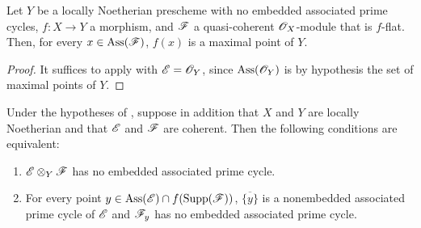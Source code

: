 \begin{corollary}[3.3.2]
\label{IV.3.3.2}
Let $Y$ be a locally Noetherian prescheme with no embedded associated prime cycles, $f:X\to Y$ a morphism, and $\mathscr{F}$ a quasi-coherent $\mathscr{O}_X$-module that is $f$-flat.
Then, for every $x\in\operatorname{Ass}(\mathscr{F})$, $f(x)$ is a maximal point of $Y$.
\end{corollary}

\begin{proof}
It suffices to apply  with $\mathscr{E}=\mathscr{O}_Y$, since $\operatorname{Ass}(\mathscr{O}_Y)$ is by hypothesis the set of maximal points of $Y$.
\end{proof}

\begin{corollary}[3.3.3]
\label{IV.3.3.3}
Under the hypotheses of , suppose in addition that $X$ and $Y$ are locally Noetherian and that $\mathscr{E}$ and $\mathscr{F}$ are coherent.
Then the following conditions are equivalent:
\begin{enumerate}
  \item[\emph{a)}] $\mathscr{E}\otimes_Y\mathscr{F}$ has no embedded associated prime cycle.
  \item[\emph{b)}] For every point $y\in\operatorname{Ass}(\mathscr{E})\cap f(\operatorname{Supp}(\mathscr{F}))$, $\overline{\{y\}}$ is a nonembedded associated prime cycle of $\mathscr{E}$ and $\mathscr{F}_y$ has no embedded associated prime cycle.
\end{enumerate}
\end{corollary}

